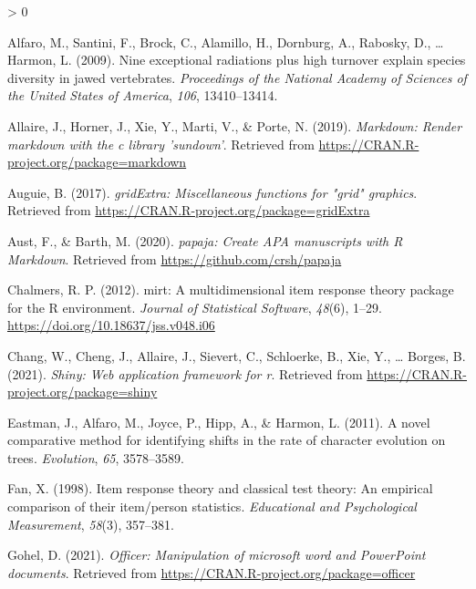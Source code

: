 \documentclass[
  english,
  man]{apa6}
\newlength{\cslhangindent}
\newenvironment{CSLReferences}[2] %
 {%
  \setlength{\parindent}{0pt}
  \ifodd #1 \everypar{\setlength{\hangindent}{\cslhangindent}}\ignorespaces\fi
  \ifnum #2 > 0
  \setlength{\parskip}{#2\baselineskip}
  \fi
 }%
 {}
\begin{document}
\hypertarget{refs}{}
\begin{CSLReferences}{1}{0}
\leavevmode\hypertarget{ref-R-geiger_a}{}%
Alfaro, M., Santini, F., Brock, C., Alamillo, H., Dornburg, A., Rabosky, D., \ldots{} Harmon, L. (2009). Nine exceptional radiations plus high turnover explain species diversity in jawed vertebrates. \emph{Proceedings of the National Academy of Sciences of the United States of America}, \emph{106}, 13410--13414.

\leavevmode\hypertarget{ref-R-markdown}{}%
Allaire, J., Horner, J., Xie, Y., Marti, V., \& Porte, N. (2019). \emph{Markdown: Render markdown with the c library 'sundown'}. Retrieved from \url{https://CRAN.R-project.org/package=markdown}

\leavevmode\hypertarget{ref-R-gridExtra}{}%
Auguie, B. (2017). \emph{gridExtra: Miscellaneous functions for "grid" graphics}. Retrieved from \url{https://CRAN.R-project.org/package=gridExtra}

\leavevmode\hypertarget{ref-R-papaja}{}%
Aust, F., \& Barth, M. (2020). \emph{{papaja}: {Create} {APA} manuscripts with {R Markdown}}. Retrieved from \url{https://github.com/crsh/papaja}

\leavevmode\hypertarget{ref-R-mirt}{}%
Chalmers, R. P. (2012). {mirt}: A multidimensional item response theory package for the {R} environment. \emph{Journal of Statistical Software}, \emph{48}(6), 1--29. \url{https://doi.org/10.18637/jss.v048.i06}

\leavevmode\hypertarget{ref-R-shiny}{}%
Chang, W., Cheng, J., Allaire, J., Sievert, C., Schloerke, B., Xie, Y., \ldots{} Borges, B. (2021). \emph{Shiny: Web application framework for r}. Retrieved from \url{https://CRAN.R-project.org/package=shiny}

\leavevmode\hypertarget{ref-R-geiger_b}{}%
Eastman, J., Alfaro, M., Joyce, P., Hipp, A., \& Harmon, L. (2011). A novel comparative method for identifying shifts in the rate of character evolution on trees. \emph{Evolution}, \emph{65}, 3578--3589.

\leavevmode\hypertarget{ref-fan1998item}{}%
Fan, X. (1998). Item response theory and classical test theory: An empirical comparison of their item/person statistics. \emph{Educational and Psychological Measurement}, \emph{58}(3), 357--381.

\leavevmode\hypertarget{ref-R-officer}{}%
Gohel, D. (2021). \emph{Officer: Manipulation of microsoft word and PowerPoint documents}. Retrieved from \url{https://CRAN.R-project.org/package=officer}


\end{CSLReferences}
\end{document}

